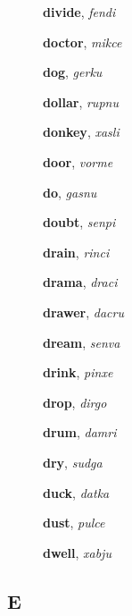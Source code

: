 \documentclass[12pt]{book}
\begin{document}
\begin{description}
\item[ ] \textbf{divide}, \textit{fendi}

\item[ ] \textbf{doctor}, \textit{mikce}

\item[ ] \textbf{dog}, \textit{gerku}

\item[ ] \textbf{dollar}, \textit{rupnu}

\item[ ] \textbf{donkey}, \textit{xasli}

\item[ ] \textbf{door}, \textit{vorme}

\item[ ] \textbf{do}, \textit{gasnu}

\item[ ] \textbf{doubt}, \textit{senpi}

\item[ ] \textbf{drain}, \textit{rinci}

\item[ ] \textbf{drama}, \textit{draci}

\item[ ] \textbf{drawer}, \textit{dacru}

\item[ ] \textbf{dream}, \textit{senva}

\item[ ] \textbf{drink}, \textit{pinxe}

\item[ ] \textbf{drop}, \textit{dirgo}

\item[ ] \textbf{drum}, \textit{damri}

\item[ ] \textbf{dry}, \textit{sudga}

\item[ ] \textbf{duck}, \textit{datka}

\item[ ] \textbf{dust}, \textit{pulce}

\item[ ] \textbf{dwell}, \textit{xabju}



\end{description}



\subsection{E} %
\end{document}

